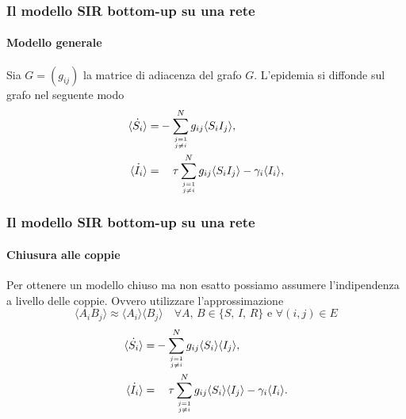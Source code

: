 \documentclass{beamer}
\newcommand{\spa}{\mathbin{\textcolor{white}{-}}}
\newcommand{\angol}[1]{\langle #1 \rangle}
\theoremstyle{definition}
\theoremstyle{plain}
\begin{document}
\begin{frame}
      \frametitle{Il modello SIR bottom-up su una rete}
\framesubtitle{Modello generale}
Sia $G = \left( g_{ij}\right)$ la matrice di adiacenza del grafo $G$. L'epidemia si diffonde sul grafo nel seguente modo 
\begin{equation*}
\begin{aligned}
	 \dot{\angol{ S_i}}=& - \sum_{j=1\atop{j\neq i }}^N g_{ij} \angol{ S_i I_j},\\
	 \dot{\angol{I_i}} =&\spa \tau \sum_{j=1\atop{j\neq i}}^N  g_{ij} \angol{ S_i I_j} -\gamma_i \angol{I_i},
\end{aligned}
\end{equation*}
\end{frame}
\begin{frame}
\frametitle{Il modello SIR bottom-up su una rete}
\framesubtitle{Chiusura alle coppie}
Per ottenere un modello chiuso ma \alert{non esatto} possiamo assumere l'indipendenza  a livello delle coppie. Ovvero utilizzare l'approssimazione 
$$ \angol{ A_i B_j } \approx \angol{ A_i }\angol{B_j} \quad \forall A, \, B \in \{ S, \, I,\, R\} \text{ e } \forall (i,j) \in E $$
\pause
\begin{equation*}
 \begin{aligned}
	 \dot{\angol{ S_i}}=& - \sum_{j=1\atop{j\neq i }}^N g_{ij} \angol{ S_i}\angol{ I_j},\\
 	 \dot{\angol{I_i}} =&\spa \tau \sum_{j=1\atop{j\neq i}}^N  g_{ij}  \angol{S_i}\angol{ I_j} -\gamma_i \angol{I_i}.
 \end{aligned}
 \end{equation*}
\end{frame}
\end{document}
